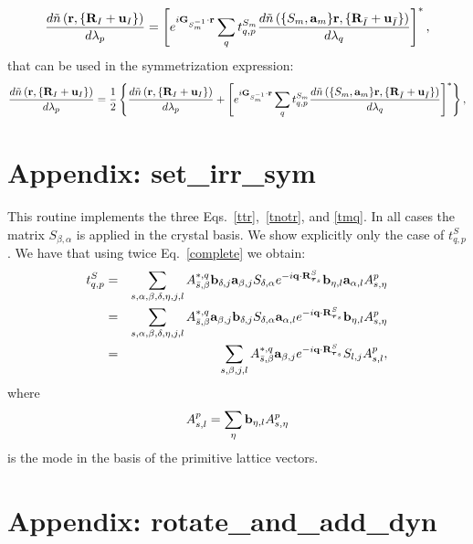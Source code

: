 \documentclass[12pt,a4paper,twoside]{report}
\begin{document}
\begin{equation}
{d \tilde n\left({\bf r}, \{{\bf R}_I + {\bf u}_I\}\right)
\over d \lambda_p} =
\left[
e^{i{\bf G}_{S^{-1}_m} \cdot {\bf r }} \sum_{q} 
t^{S_m}_{q,p}
{d \tilde n\left(\{S_m,{\bf a}_m\} {\bf r}, \{{\bf R}_{\bar I} + {\bf u}_{\bar I}\}\right)
\over d \lambda_q} \right]^*,
\end{equation}
that can be used in the symmetrization expression:
\begin{equation}
{d \tilde n\left({\bf r}, \{{\bf R}_I + {\bf u}_I\}\right)
\over d \lambda_p} ={1\over 2}\left\{
{d \tilde n\left({\bf r}, \{{\bf R}_I + {\bf u}_I\}\right)
\over d \lambda_p}+
\left[
e^{i{\bf G}_{S^{-1}_m} \cdot {\bf r }} \sum_{q} 
t^{S_m}_{q,p}
{d \tilde n\left(\{S_m,{\bf a}_m\} {\bf r}, \{{\bf R}_{\bar I} + {\bf u}_{\bar I}\}\right)
\over d \lambda_q} \right]^* \right\},
\end{equation}

\section{Appendix: set\_irr\_sym}
This routine implements the three Eqs.~\ref{ttr},~\ref{tnotr}, and \ref{tmq}. In all cases the matrix $S_{\beta,\alpha}$ is applied in 
the crystal basis. We show explicitly only the
case of $t^S_{q,p}$. We have that using twice Eq.~\ref{complete} we obtain:
\begin{eqnarray}
t_{q,p}^S&=&
\sum_{s,\alpha,\beta, \delta, \eta, j, l}
 A^{*,q}_{\bar s,\beta} {\bf b}_{\delta, j} {\bf a}_{\beta, j} S_{\delta,\alpha} e^{-i{\bf q}\cdot {\bf R}^S_{{\boldsymbol{\tau}_s}}} {\bf b}_{\eta, l} {\bf a}_{\alpha, l}  A^p_{s,\eta}\nonumber \\ &=&
 \sum_{s,\alpha,\beta, \delta, \eta, j, l}
 A^{*,q}_{\bar s,\beta}  {\bf a}_{\beta, j} {\bf b}_{\delta, j} S_{\delta,\alpha} {\bf a}_{\alpha, l} e^{-i{\bf q}\cdot {\bf R}^S_{{\boldsymbol{\tau}_s}}} {\bf b}_{\eta, l} A^p_{s,\eta} \nonumber \\ &=&
 \sum_{s,\beta,j,l}
 A^{*,q}_{\bar s,\beta}  {\bf a}_{\beta, j}    e^{-i{\bf q}\cdot {\bf R}^S_{{\boldsymbol{\tau}_s}}}  S_{l,j} A^p_{s,l},
\label{tnotr_crys}
\end{eqnarray}
where
\begin{equation}
A^p_{s,l} = \sum_\eta {\bf b}_{\eta, l} A^p_{s,\eta}
\end{equation}
\newpage
is the mode in the basis of the primitive lattice vectors.

\section{Appendix: rotate\_and\_add\_dyn}
\end{document}
